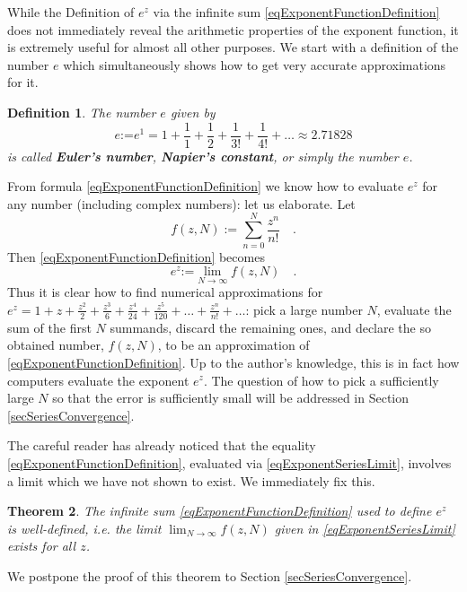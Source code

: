 \documentclass[12pt]{book}
\newcommand{\eqdef}{\textbf{:=}}
\newtheorem{theorem}{Theorem}[section]
\newtheorem{definition}[theorem]{Definition}
\renewcommand{\emph}{\textbf}
\begin{document}
While the Definition of $e^z$ via the infinite sum \eqref{eqExponentFunctionDefinition} does not immediately reveal the arithmetic properties of the exponent function, it is extremely useful for almost all other purposes. We start with a definition of the number $e$ which simultaneously shows how to get very accurate approximations for it.
\begin{definition}\label{defE} 
The number $e$ given by
\[
e\eqdef e^1= 1+ \frac{1}{1} +\frac{1}2 +\frac{1}{3!} +\frac{1}{4!}+\dots \approx 2.71828
\]
is called \emph{Euler's number}, \emph{Napier's constant}, or simply the number $e$.
\end{definition}
From formula \eqref{eqExponentFunctionDefinition} we know how to evaluate $e^z$ for any number (including complex numbers): let us elaborate. Let
\begin{equation}\label{eqExponentSeriesLimit}
\displaystyle f(z,N):=\sum\limits_{n=0}^{N} \frac{z^n}{n!}\quad .
\end{equation}
Then \eqref{eqExponentFunctionDefinition} becomes
\[
e^z\eqdef \displaystyle\lim\limits_{N\to \infty} f(z, N)\quad .
\]
Thus it is clear how to find numerical approximations for $e^z= 1+z+\frac{z^{2}}{2} +\frac{z^3}{6} +\frac{z^4}{24} +\frac{z^5}{120} +\dots+\frac{z^n}{n!}+\dots$: pick a large number $N$, evaluate the sum of the first $N$ summands, discard the remaining ones, and declare the so obtained number, $f(z,N)$, to be an approximation of \eqref{eqExponentFunctionDefinition}. Up to the author's knowledge, this is in fact how computers evaluate the exponent $e^z$. The question of how to pick a sufficiently large $N$ so that the error is sufficiently small will be addressed in Section \ref{secSeriesConvergence}.

The careful reader has already noticed that the equality \eqref{eqExponentFunctionDefinition}, evaluated via \eqref{eqExponentSeriesLimit}, involves a limit which we have not shown to exist. We immediately fix this.
\begin{theorem} The infinite sum \eqref{eqExponentFunctionDefinition} used to define $e^z$ is well-defined, i.e. the limit $\displaystyle\lim_{N\to \infty} f(z, N)$ given in \eqref{eqExponentSeriesLimit} exists for all $z$.
\end{theorem}
We postpone the proof of this theorem to Section \ref{secSeriesConvergence}.
\end{document}
